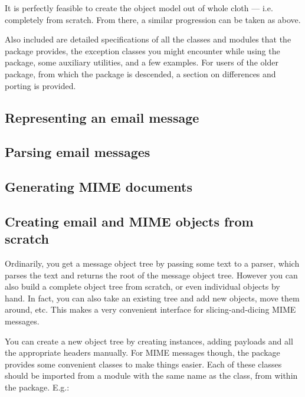 It is perfectly feasible to create the object model out of whole cloth
--- i.e. completely from scratch.  From there, a similar progression
can be taken as above.  

Also included are detailed specifications of all the classes and
modules that the  package provides, the exception
classes you might encounter while using the  package,
some auxiliary utilities, and a few examples.  For users of the older
 package, from which the  package is
descended, a section on differences and porting is provided.

\begin{seealso}
\end{seealso}

\subsection{Representing an email message}


\subsection{Parsing email messages}


\subsection{Generating MIME documents}


\subsection{Creating email and MIME objects from scratch}

Ordinarily, you get a message object tree by passing some text to a
parser, which parses the text and returns the root of the message
object tree.  However you can also build a complete object tree from
scratch, or even individual  objects by hand.  In fact,
you can also take an existing tree and add new 
objects, move them around, etc.  This makes a very convenient
interface for slicing-and-dicing MIME messages.

You can create a new object tree by creating 
instances, adding payloads and all the appropriate headers manually.
For MIME messages though, the  package provides some
convenient classes to make things easier.  Each of these classes
should be imported from a module with the same name as the class, from
within the  package.  E.g.:

